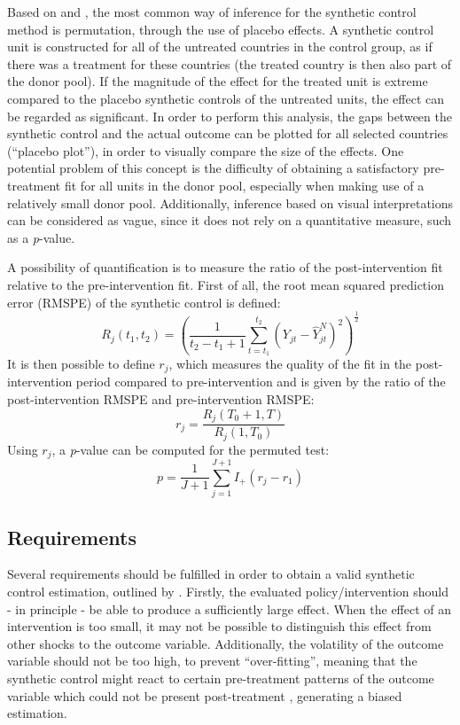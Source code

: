 \documentclass{scrbook}
\begin{document}
Based on \textcite{abadie_synthetic_2010} and
\textcite{abadie_using_2021}, the most common way of inference for the
synthetic control method is permutation, through the use of placebo
effects. A synthetic control unit is constructed for all of the
untreated countries in the control group, as if there was a treatment
for these countries (the treated country is then also part of the donor
pool). If the magnitude of the effect for the treated unit is extreme
compared to the placebo synthetic controls of the untreated units, the
effect can be regarded as significant. In order to perform this
analysis, the gaps between the synthetic control and the actual outcome
can be plotted for all selected countries (``placebo plot''), in order
to visually compare the size of the effects. One potential problem of
this concept is the difficulty of obtaining a satisfactory pre-treatment
fit for all units in the donor pool, especially when making use of a
relatively small donor pool. Additionally, inference based on visual
interpretations can be considered as vague, since it does not rely on a
quantitative measure, such as a \textit{p}-value.

A possibility of quantification is to measure the ratio of the
post-intervention fit relative to the pre-intervention fit. First of
all, the root mean squared prediction error (RMSPE) of the synthetic
control is defined: \begin{equation}
R_{j}(t_{1},t_{2}) =(\frac{1}{t_{2}-t_{1}+1}\sum_{t=t_{1}}^{t_{2}}(Y_{jt}-\hat{Y}_{jt}^{N})^2)^\frac{1}{2}
\end{equation} It is then possible to define \(r_{j}\), which measures
the quality of the fit in the post-intervention period compared to
pre-intervention and is given by the ratio of the post-intervention
RMSPE and pre-intervention RMSPE: \begin{equation}
r_{j}=\frac{R_{j}(T_{0}+1,T)}{R_{j}(1,T_{0})}
\end{equation} Using \(r_{j}\), a \textit{p}-value can be computed for
the permuted test: \begin{equation}
p=\frac{1}{J+1}\sum_{j=1}^{J+1}I_{+}(r_{j}-r_{1})
\end{equation}

\subsection*{Requirements}

Several requirements should be fulfilled in order to obtain a valid
synthetic control estimation, outlined by \textcite{abadie_using_2021}.
Firstly, the evaluated policy/intervention should - in principle - be
able to produce a sufficiently large effect. When the effect of an
intervention is too small, it may not be possible to distinguish this
effect from other shocks to the outcome variable. Additionally, the
volatility of the outcome variable should not be too high, to prevent
``over-fitting'', meaning that the synthetic control might react to
certain pre-treatment patterns of the outcome variable which could not
be present post-treatment \parencite{hollingsworth_tactics_2022},
generating a biased estimation.
\end{document}
